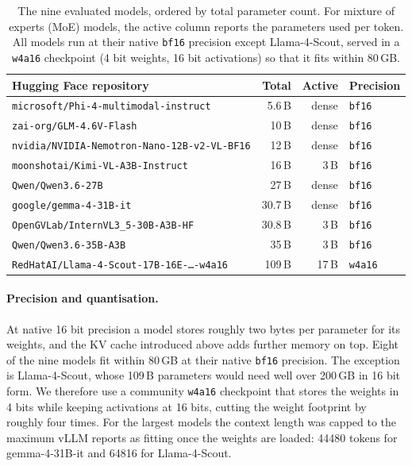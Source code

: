 \begin{table}[t]
	\centering
	\caption{The nine evaluated models, ordered by total parameter count. For mixture of experts (MoE) models, the active column reports the parameters used per token. All models run at their native \texttt{bf16} precision except Llama-4-Scout, served in a \texttt{w4a16} checkpoint (4 bit weights, 16 bit activations) so that it fits within \num{80}\,GB.}
	\label{tab:models}
	\begin{tabular}{lrrl}
		\toprule
		\textbf{Hugging Face repository} & \textbf{Total} & \textbf{Active} & \textbf{Precision} \\
		\midrule
		\texttt{microsoft/Phi-4-multimodal-instruct}         & \num{5.6}\,B  & dense        & \texttt{bf16} \\
		\texttt{zai-org/GLM-4.6V-Flash}                     & \num{10}\,B   & dense        & \texttt{bf16} \\
		\texttt{nvidia/NVIDIA-Nemotron-Nano-12B-v2-VL-BF16}  & \num{12}\,B   & dense        & \texttt{bf16} \\
		\texttt{moonshotai/Kimi-VL-A3B-Instruct}            & \num{16}\,B   & \num{3}\,B   & \texttt{bf16} \\
		\texttt{Qwen/Qwen3.6-27B}                           & \num{27}\,B   & dense        & \texttt{bf16} \\
		\texttt{google/gemma-4-31B-it}                      & \num{30.7}\,B & dense        & \texttt{bf16} \\
		\texttt{OpenGVLab/InternVL3\_5-30B-A3B-HF}          & \num{30.8}\,B & \num{3}\,B   & \texttt{bf16} \\
		\texttt{Qwen/Qwen3.6-35B-A3B}                       & \num{35}\,B   & \num{3}\,B   & \texttt{bf16} \\
		\texttt{RedHatAI/Llama-4-Scout-17B-16E-\dots-w4a16} & \num{109}\,B  & \num{17}\,B  & \texttt{w4a16} \\
		\bottomrule
	\end{tabular}
\end{table}


\paragraph{Precision and quantisation.}
At native 16 bit precision a model stores roughly two bytes per parameter for its weights, and the KV cache introduced above adds further memory on top. Eight of the nine models fit within \num{80}\,GB at their native \texttt{bf16} precision. The exception is Llama-4-Scout, whose \num{109}\,B parameters would need well over \num{200}\,GB in 16 bit form. We therefore use a community \texttt{w4a16} checkpoint that stores the weights in 4 bits while keeping activations at 16 bits, cutting the weight footprint by roughly four times. For the largest models the context length was capped to the maximum vLLM reports as fitting once the weights are loaded: \num{44480} tokens for gemma-4-31B-it and \num{64816} for Llama-4-Scout.

